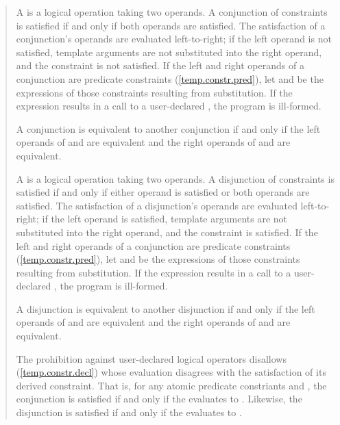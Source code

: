 \begin{quote}
\pnum
A  is a logical operation taking two 
operands. A conjunction of constraints is satisfied if and only 
if both operands are satisfied. 
% 
The satisfaction of a conjunction's operands are evaluated left-to-right; 
if the left operand is not satisfied, template arguments are not 
substituted into the right operand, and the constraint is not satisfied.
% 
If the left and right operands of a conjunction are predicate constraints
(\ref{temp.constr.pred}), let  and  be the expressions
of those constraints resulting from substitution. If the expression
 results in a call to a user-declared ,
the program is ill-formed.


\pnum
A conjunction  is equivalent to another conjunction 
if and only if the left operands of  and  are equivalent
and the right operands of  and  are equivalent.

\pnum
A  is a logical operation taking two 
operands. A disjunction of constraints is satisfied if and only 
if either operand is satisfied or both operands are satisfied.
% 
The satisfaction of a disjunction's operands are evaluated left-to-right; 
if the left operand is satisfied, template arguments are not 
substituted into the right operand, and the constraint is satisfied.
%
If the left and right operands of a conjunction are predicate constraints
(\ref{temp.constr.pred}), let  and  be the expressions
of those constraints resulting from substitution. If the expression
 results in a call to a user-declared ,
the program is ill-formed.

\pnum
A disjunction  is equivalent to another disjunction 
if and only if the left operands of  and  are equivalent
and the right operands of  and  are equivalent.

\pnum
\enternote
The prohibition against user-declared logical operators disallows
 (\ref{temp.constr.decl}) whose 
evaluation disagrees with the satisfaction of its derived constraint.
That is, for any atomic predicate constriants  and ,
the conjunction  is satisfied if and only if
the   evaluates to
. Likewise, the disjunction  is satisfied 
if and only if the  
evaluates to .
\exitnote



\end{quote}
